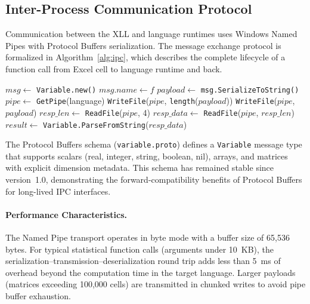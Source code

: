 \subsection{Inter-Process Communication Protocol}
\label{subsec:ipc}

Communication between the XLL and language runtimes uses Windows Named Pipes with Protocol Buffers serialization. The message exchange protocol is formalized in Algorithm~\ref{alg:ipc}, which describes the complete lifecycle of a function call from Excel cell to language runtime and back.

\begin{algorithm}[htbp]
\SetAlgoLined
{}
\BlankLine
{}
$msg \leftarrow$ \texttt{Variable.new()}\;
$msg.name \leftarrow f$\;
$payload \leftarrow$ \texttt{msg.SerializeToString()}\;
\BlankLine
{}
$pipe \leftarrow$ \texttt{GetPipe}(language)\;
\texttt{WriteFile}($pipe$, \texttt{length}($payload$))
\texttt{WriteFile}($pipe$, $payload$)\;
\BlankLine
{}
$resp\_len \leftarrow$ \texttt{ReadFile}($pipe$, 4)\;
$resp\_data \leftarrow$ \texttt{ReadFile}($pipe$, $resp\_len$)\;
$result \leftarrow$ \texttt{Variable.ParseFromString}($resp\_data$)\;
\BlankLine
{}
\caption{IPC Protocol for Function Dispatch}
\label{alg:ipc}
\end{algorithm}

The Protocol Buffers schema (\texttt{variable.proto}) defines a \texttt{Variable} message type that supports scalars (real, integer, string, boolean, nil), arrays, and matrices with explicit dimension metadata. This schema has remained stable since version~1.0, demonstrating the forward-compatibility benefits of Protocol Buffers for long-lived IPC interfaces.

\paragraph{Performance Characteristics.}
The Named Pipe transport operates in byte mode with a buffer size of 65,536 bytes. For typical statistical function calls (arguments under 10~KB), the serialization--transmission--deserialization round trip adds less than 5~ms of overhead beyond the computation time in the target language. Larger payloads (matrices exceeding 100,000 cells) are transmitted in chunked writes to avoid pipe buffer exhaustion.

